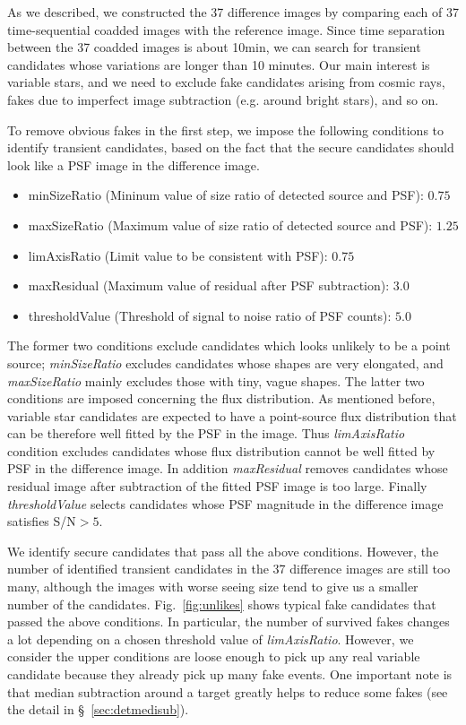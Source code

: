 \documentclass[iop, apj]{emulateapj}
\newcommand{\?}{\stackrel{?}{=}}
\begin{document}
As we described, we constructed the 37 difference images by comparing each of 37 time-sequential coadded images with the reference image. Since time separation between the 37 coadded images is about 10min, we can search for transient candidates whose variations are longer than 10 minutes. Our main interest is variable stars, and we need to exclude fake candidates arising from cosmic rays, fakes due to imperfect image subtraction (e.g. around bright stars), and so on. 

To remove obvious fakes in the first step, we impose the following conditions to identify transient candidates, based on the fact that the secure candidates should look like a PSF image in the difference image. 
%
\begin{itemize}
\item{minSizeRatio (Mininum value of size ratio of detected source and PSF): $0.75$}
\item{maxSizeRatio (Maximum value of size ratio of detected source and PSF): $1.25$}
\item{limAxisRatio (Limit value to be consistent with PSF): $0.75$}
\item{maxResidual (Maximum value of residual after PSF subtraction): $3.0$}
\item{thresholdValue (Threshold of signal to noise ratio of PSF counts): $5.0$}
\end{itemize}
%
The former two conditions exclude candidates which looks unlikely to be a point source; {\it minSizeRatio} excludes candidates whose shapes are very elongated, and {\it maxSizeRatio} mainly excludes those with tiny, vague shapes. The latter two conditions are imposed concerning the flux distribution. As mentioned before, variable star candidates are expected to have a point-source flux distribution that can be therefore well fitted by the PSF in the image. Thus {\it limAxisRatio} condition excludes candidates whose flux distribution cannot be well fitted by PSF in the difference image. In addition {\it maxResidual} removes candidates whose residual image after subtraction of the fitted PSF image is too large. Finally {\it thresholdValue} selects candidates whose PSF magnitude in the difference image satisfies S/N$>5$. 

We identify secure candidates that pass all the above conditions. However, the number of identified transient candidates in the 37 difference images are still too many, although the images with worse seeing size tend to give us a smaller number of the candidates. 
Fig.~\ref{fig:unlikes} shows typical fake candidates that passed the above conditions. In particular, the number of survived fakes changes a lot depending on a chosen threshold value of {\it limAxisRatio}. However, we consider the upper conditions are loose enough to pick up any real variable candidate because they already pick up many fake events. One important note is that median subtraction around a target greatly helps to reduce some fakes (see the detail in \S~\ref{sec:detmedisub}). 
\end{document}
